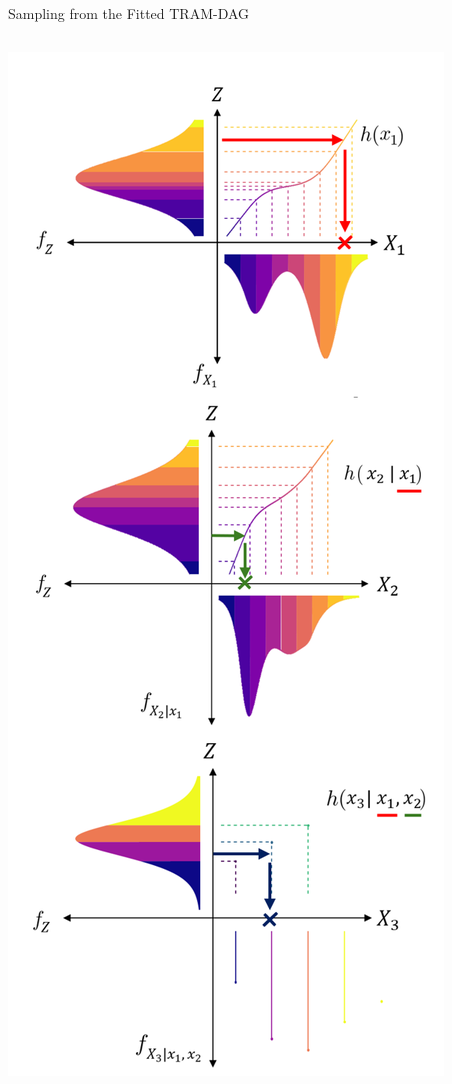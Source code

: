 \documentclass[onlytextwidth,english]{beamer}\usepackage[]{graphicx}\usepackage[]{xcolor}
\begin{document}
\begin{frame}{Sampling from the Fitted TRAM-DAG}
\begin{columns}
\begin{column}{0.3\textwidth}
\includegraphics[width=0.9\linewidth]{img/Sampling.png}
\end{column}

\end{columns}

\end{frame}
\end{document}
